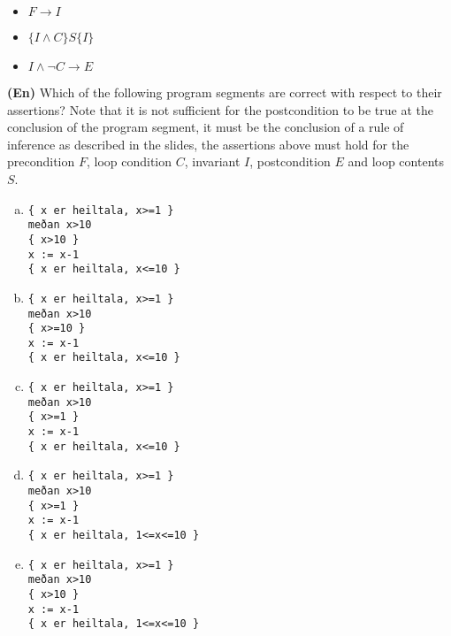 \documentclass{article}
\begin{document}
\begin{itemize}
\item $F\rightarrow I$
\item $\{I \wedge C\}S\{I\}$
\item $I\wedge\neg C\rightarrow E$
\end{itemize}

\textbf{(En)} Which of the following program segments are correct with respect to their assertions? Note that it is not sufficient for the postcondition to be true at the conclusion of the program segment, it must be the conclusion of a rule of inference as described in the slides, the assertions above must hold for the precondition $F$, loop condition $C$, invariant $I$, postcondition $E$ and loop contents $S$.

\begin{enumerate}[a)]
\item
\begin{verbatim}
{ x er heiltala, x>=1 }
meðan x>10
{ x>10 }
x := x-1
{ x er heiltala, x<=10 }
\end{verbatim}
\item
\begin{verbatim}
{ x er heiltala, x>=1 }
meðan x>10
{ x>=10 }
x := x-1
{ x er heiltala, x<=10 }
\end{verbatim}
\item
\begin{verbatim}
{ x er heiltala, x>=1 }
meðan x>10
{ x>=1 }
x := x-1
{ x er heiltala, x<=10 }
\end{verbatim}
\item
\begin{verbatim}
{ x er heiltala, x>=1 }
meðan x>10
{ x>=1 }
x := x-1
{ x er heiltala, 1<=x<=10 }
\end{verbatim}
\item
\begin{verbatim}
{ x er heiltala, x>=1 }
meðan x>10
{ x>10 }
x := x-1
{ x er heiltala, 1<=x<=10 }
\end{verbatim}
\end{enumerate}
\end{document}
